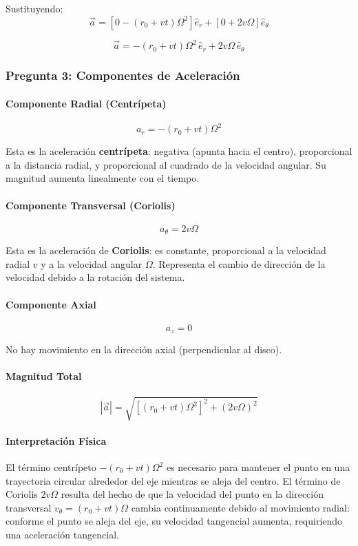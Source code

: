 \begin{sol}
Sustituyendo:
\begin{equation}
\vec{a} = [0 - (r_0 + vt)\Omega^2] \hat{e}_r + [0 + 2v\Omega] \hat{e}_\theta
\end{equation}

\begin{equation}
\boxed{\vec{a} = -(r_0 + vt) \Omega^2 \, \hat{e}_r + 2v\Omega \, \hat{e}_\theta}
\end{equation}

\subsubsection*{Pregunta 3: Componentes de Aceleración}

\paragraph{Componente Radial (Centrípeta)}
$$a_r = -(r_0 + vt) \Omega^2$$

Esta es la aceleración \textbf{centrípeta}: negativa (apunta hacia el centro), proporcional a la distancia radial, y proporcional al cuadrado de la velocidad angular. Su magnitud aumenta linealmente con el tiempo.

\paragraph{Componente Transversal (Coriolis)}
$$a_\theta = 2v\Omega$$

Esta es la aceleración de \textbf{Coriolis}: es constante, proporcional a la velocidad radial $v$ y a la velocidad angular $\Omega$. Representa el cambio de dirección de la velocidad debido a la rotación del sistema.

\paragraph{Componente Axial}
$$a_z = 0$$

No hay movimiento en la dirección axial (perpendicular al disco).

\paragraph{Magnitud Total}
\begin{equation}
|\vec{a}| = \sqrt{[(r_0 + vt) \Omega^2]^2 + (2v\Omega)^2}
\end{equation}

\paragraph{Interpretación Física}

El término centrípeto $-(r_0 + vt) \Omega^2$ es necesario para mantener el punto en una trayectoria circular alrededor del eje mientras se aleja del centro. El término de Coriolis $2v\Omega$ resulta del hecho de que la velocidad del punto en la dirección transversal $v_\theta = (r_0 + vt) \Omega$ cambia continuamente debido al movimiento radial: conforme el punto se aleja del eje, su velocidad tangencial aumenta, requiriendo una aceleración tangencial.

\end{sol}
